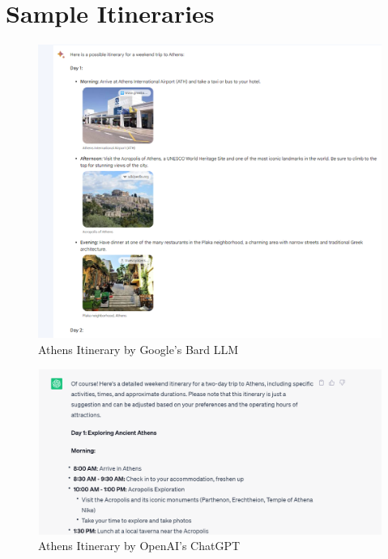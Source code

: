 \documentclass[12pt,a4paper]{report}
\begin{document}
\chapter{Sample Itineraries}
\begin{figure}[H]
    \centering
    \includegraphics[scale=.5]{athensbardexample}
    \caption{Athens Itinerary by Google's Bard LLM}
\end{figure}

\begin{figure}[H]
    \centering
    \includegraphics[scale=.8]{chatgptitin}
    \caption{Athens Itinerary by OpenAI's ChatGPT}
\end{figure}
\end{document}
